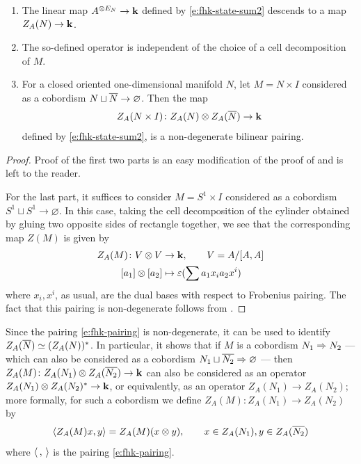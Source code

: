 \begin{theorem}\label{t:fhk2}
  \par\noindent
  \begin{enumerate}
    \item The linear map $A^{\otimes E_N}\to \kk$
      defined by \eqref{e:fhk-state-sum2} descends to a
      map $Z_A(N)\to \kk$.
    \item The so-defined operator is independent of the choice of a cell
      decomposition of $M$.
    \item For a closed oriented one-dimensional manifold $N$, let
      $M=N\times I$ considered as a cobordism $N\sqcup \ov{N}\to
       \varnothing$. Then the map
    \begin{equation}\label{e:fhk-pairing}
      Z_A(N\times I)\colon Z_A(N)\otimes Z_A(\ov{N})\to \kk
    \end{equation}
    defined by \eqref{e:fhk-state-sum2}, is a non-degenerate bilinear pairing.
  \end{enumerate}
\end{theorem}
\begin{proof}
  Proof of the first two parts is an easy
  modification of the proof of  and is left to the reader.

  For the last part, it suffices to consider $M=S^1\times I$ considered as a
  cobordism $S^1\sqcup S^1\to \varnothing$. In this case, taking the cell
  decomposition of the cylinder obtained by gluing two opposite sides of
  rectangle together, we see that the corresponding map $Z(M)$ is given by
  \begin{align*}
    Z_A(M)\colon V\otimes V &\to \kk, \qquad V=A/[A,A]\\
    [a_1]\otimes [a_2]&\mapsto \eps(\sum a_1 x_i a_2x^i)
  \end{align*}
  where $x_i, x^i$, as usual, are the dual bases with respect to Frobenius
  pairing. The fact that this pairing is non-degenerate follows from
  .
\end{proof}


Since the pairing \eqref{e:fhk-pairing} is non-degenerate, it can be used to
identify $Z_A(\ov{N})\simeq (Z_A(N))^*$. In particular, it shows that if $M$ is
a cobordism $N_1\cob{M}N_2$ --- which can also be considered as a cobordism
$N_1\sqcup \ov{N_2}\cob{} \varnothing$ --- then $Z_A(M)\colon Z_A(N_1)\otimes
Z_A(\ov{N_2}) \to \kk$ can also be considered as an operator $Z_A(N_1)\otimes
Z_A(N_2)^*\to\kk$, or equivalently, as an operator $Z_A(N_1)\to Z_A(N_2)$; more
formally, for such a cobordism we define $Z_A(M)\colon Z_A(N_1)\to
Z_A(N_2)$ by
\begin{equation}\label{e:fhk-state-sum3}
  \<Z_A(M)x, y\>= Z_A(M)(x\otimes y), \qquad x \in Z_A(N_1), y \in Z_A(\ov{N_2})
\end{equation}
where $\<\, , \,\>$ is the pairing \eqref{e:fhk-pairing}.


